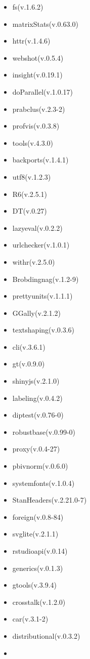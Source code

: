 \documentclass[
]{article}
\providecommand{\tightlist}{%
  \setlength{\itemsep}{0pt}\setlength{\parskip}{0pt}}
\begin{document}
\begin{itemize}
\tightlist
\item
  fs(v.1.6.2)
\item
  matrixStats(v.0.63.0)
\item
  httr(v.1.4.6)
\item
  webshot(v.0.5.4)
\item
  insight(v.0.19.1)
\item
  doParallel(v.1.0.17)
\item
  prabclus(v.2.3-2)
\item
  profvis(v.0.3.8)
\item
  tools(v.4.3.0)
\item
  backports(v.1.4.1)
\item
  utf8(v.1.2.3)
\item
  R6(v.2.5.1)
\item
  DT(v.0.27)
\item
  lazyeval(v.0.2.2)
\item
  urlchecker(v.1.0.1)
\item
  withr(v.2.5.0)
\item
  Brobdingnag(v.1.2-9)
\item
  prettyunits(v.1.1.1)
\item
  GGally(v.2.1.2)
\item
  textshaping(v.0.3.6)
\item
  cli(v.3.6.1)
\item
  gt(v.0.9.0)
\item
  shinyjs(v.2.1.0)
\item
  labeling(v.0.4.2)
\item
  diptest(v.0.76-0)
\item
  robustbase(v.0.99-0)
\item
  proxy(v.0.4-27)
\item
  pbivnorm(v.0.6.0)
\item
  systemfonts(v.1.0.4)
\item
  StanHeaders(v.2.21.0-7)
\item
  foreign(v.0.8-84)
\item
  svglite(v.2.1.1)
\item
  rstudioapi(v.0.14)
\item
  generics(v.0.1.3)
\item
  gtools(v.3.9.4)
\item
  crosstalk(v.1.2.0)
\item
  car(v.3.1-2)
\item
  distributional(v.0.3.2)
\item

\end{itemize}
\end{document}
